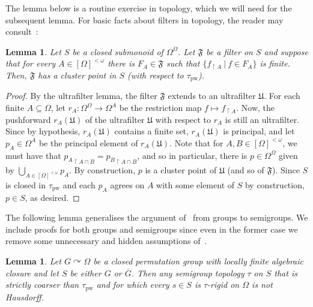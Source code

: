\documentclass{article}
\newtheorem{lemma}[theorem]{Lemma}
\theoremstyle{remark}
\theoremstyle{definition}
\def\acts{\curvearrowright}
\newcommand{\pw}[0]{\tau_{\mathrm{pw}}}
\newcommand{\fps}[1]{[#1]^{<\omega}}
\begin{document}
{{{{{{The lemma below is a routine exercise in topology, which we will need for the subsequent lemma. For basic facts about filters in topology, the reader may consult~\cite[$\S$ 12]{willard2012general}:}
 \begin{lemma}\label{lem:filterlemma} {Let $S$ be a closed submonoid of $\Omega^\Omega$. Let $\mathfrak{F}$ be a filter on $S$ and suppose that for every $A\in\fps{\Omega}$ there is $F_A\in\mathfrak{F}$ such that $\{f_{\upharpoonright A} \ \vert \ f\in F_A\}$ is finite. Then, $\mathfrak{F}$ has a cluster point in $S$ (with respect to $\pw$).}    
   \end{lemma}
   \begin{proof} {By the ultrafilter lemma, the filter $\mathfrak{F}$ extends to an ultrafilter $\mathfrak{U}$. For each finite $A\subseteq \Omega$, let $r_A:\Omega^\Omega\to \Omega^A$ be the restriction map $f\mapsto f_{\upharpoonright A}$. Now, the pushforward $r_A(\mathfrak{U})$ of the ultrafilter $\mathfrak{U}$ with respect to $r_A$ is still an ultrafilter. Since by hypothesis, $r_A(\mathfrak{U})$ contains a finite set, $r_A(\mathfrak{U})$ is principal, and let $p_A\in\Omega^A$ be the principal element of $r_A(\mathfrak{U})$. Note that for $A, B\in\fps{\Omega}$, we must have that ${p_A}_{\upharpoonright A\cap B}={p_B}_{\upharpoonright A\cap B}$, and so in particular, there is $p\in\Omega^\Omega$ given by $\bigcup_{A\in\fps{\Omega}} p_A$. By construction, $p$ is a cluster point of $\mathfrak{U}$ (and so of $\mathfrak{F}$).  Since $S$ is closed in $\pw$ and each $p_A$ agrees on $A$ with some element of $S$ by construction, $p\in S$, as desired.}
   \end{proof}
   
  
  The following lemma generalises the argument of~\cite[Lemma 2.7]{ghaddln24} from groups to semigroups. We include proofs for both groups and semigroups since even in the former case we remove some unnecessary and hidden assumptions of~\cite[Lemma 2.7]{ghaddln24}.


  
    
    \begin{lemma}\label{rigidity over all implies non T2}  Let $G\acts \Omega$ be a closed permutation group  with locally finite algebraic closure and let $S$ be either $G$ or $\overline{G}$. %
    Then any semigroup topology $\tau$ on $S$ that is strictly coarser than $\pw$ and for which every $s\in S$ is $\tau$-rigid on $\Omega$ %
    {is not Hausdorff.}
   \end{lemma}
   
}}}}}
\end{document}
